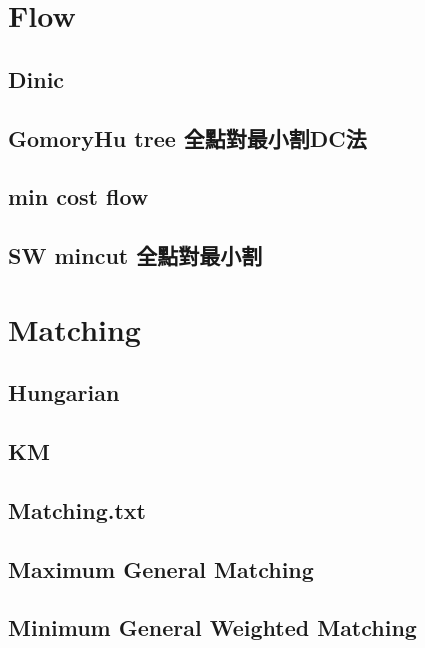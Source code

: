 \section{Flow}
	\subsection{Dinic}
		
	\subsection{GomoryHu tree 全點對最小割DC法}
		
%		
	\subsection{min cost flow}
		
	\subsection{SW mincut 全點對最小割}
		


\section{Matching}
	\subsection{Hungarian}
		
	\subsection{KM}
		
	\subsection{Matching.txt}
		
	\subsection{Maximum General Matching}
		
	\subsection{Minimum General Weighted Matching}
		



